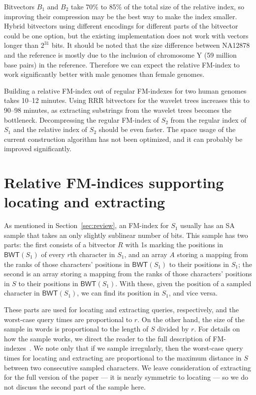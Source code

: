 \documentclass{llncs}
\newcommand{\BWT}
  {\ensuremath{\mathsf{BWT}}}
\begin{document}
Bitvectors $B_{1}$ and $B_{2}$ take 70\% to 85\% of the total size of the
relative index, so improving their compression may be the best way to make the index smaller.
Hybrid bitvectors using different encodings for different
parts of the bitvector~\cite{Kaerkkaeinen2014} could be one option, but
the existing implementation does not work with vectors longer than $2^{31}$
bits. It should be noted that the size difference between NA12878 and the reference is mostly due to the inclusion of chromosome Y (59 million base pairs) in the reference. Therefore we can expect the relative FM-index to work significantly better with male genomes than female genomes.

Building a relative FM-index out of regular FM-indexes for two human genomes takes 10--12 minutes. Using RRR bitvectors for the wavelet trees increases this to 90--98 minutes, as extracting substrings from the wavelet trees becomes the bottleneck. Decompressing the regular FM-index of $S_{2}$ from the regular index of $S_{1}$ and the relative index of $S_{2}$ should be even faster. The space usage of the current construction algorithm has not been optimized, and it can probably be improved significantly.


\section{Relative FM-indices supporting locating and extracting}
\label{sec:djamal&giovanni}


As mentioned in Section~\ref{sec:review}, an FM-index for $S_1$ usually has
an SA sample that takes an only slightly sublinear number of bits.  This
sample has two parts: the first consists of a bitvector $R$ with 1s marking
the positions in \(\BWT (S_1)\) of every $r$th character in $S_1$, and an
array $A$ storing a mapping from the ranks of those characters' positions in
\(\BWT (S_1)\) to their positions in $S_1$; the second is an array storing a
mapping from the ranks of those characters' positions in $S$ to their
positions in \(\BWT (S_1)\).  With these, given the position of a sampled
character in \(\BWT (S_1)\), we can find its position in $S_1$, and vice
versa.

These parts are used for locating and extracting queries, respectively, and
the worst-case query times are proportional to $r$.  On the other hand, the
size of the sample in words is proportional to the length of $S$ divided by
$r$.  For details on how the sample works, we direct the reader to the full
description of FM-indexes~\cite{FM05}.  We note only that if we sample
irregularly, then the worst-case query times for locating and extracting are
proportional to the maximum distance in $S$ between two consecutive sampled
characters.  We leave consideration of extracting for the full version of the
paper --- it is nearly symmetric to locating --- so we do not discuss the
second part of the sample here.
\end{document}
